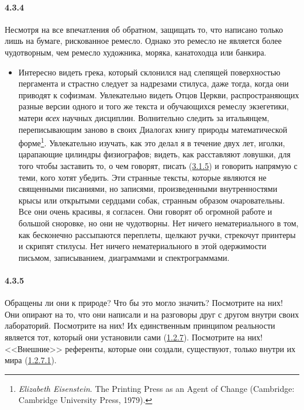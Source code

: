 \paragraph{4.3.4}\hypertarget{par:4.3.4}{} Несмотря на все впечатления об обратном, защищать то, что написано только лишь на бумаге, рискованное ремесло. Однако это ремесло не является более чудотворным, чем ремесло художника, моряка, канатоходца или банкира.
	\begin{itemize}
	\item 
	Интересно видеть грека, который склонился над слепящей поверхностью пергамента и страстно следует за надрезами стилуса, даже тогда, когда они приводят к софизмам. Увлекательно видеть Отцов Церкви, распространяющих разные версии одного и того же текста и обучающихся ремеслу экзегетики, матери {\itshape всех} научных дисциплин. Волнительно следить за итальянцем, переписывающим заново в своих Диалогах книгу природы математической форме\footnote{{\itshape Elizabeth Eisenstein}. The Printing Press as an Agent of Change (Cam­bridge: Cambridge University Press, 1979).}. Увлекательно изучать, как это делал я в течение двух лет, иголки, царапающие цилиндры физиографов; видеть, как расставляют ловушки, для того чтобы заставить то, о чем говорят, писать (\hyperlink{par:3.1.5}{3.1.5}) и говорить напрямую с теми, кого хотят убедить. Эти странные тексты, которые являются не священными писаниями, но записями, произведенными внутренностями крысы или открытыми сердцами собак, странным образом очаровательны. Все они очень красивы, я согласен. Они говорят об огромной работе и большой сноровке, но они не чудотворны. Нет ничего нематериального в том, как бесконечно рассыпаются переплеты, щелкают ручки, стрекочут принтеры и скрипят стилусы. Нет ничего нематериального в этой одержимости письмом, записыванием, диаграммами и спектрограммами.
	\end{itemize}	

\paragraph{4.3.5}\hypertarget{par:4.3.5}{} Обращены ли они к природе? Что бы это могло значить? Посмотрите на них! Они опирают на то, что они написали и на разговоры друг с другом внутри своих лабораторий. Посмотрите на них! Их единственным принципом реальности является тот, который они установили сами (\hyperlink{par:1.2.7}{1.2.7}). Посмотрите на них! <<Внешние>> референты, которые они создали, существуют, только внутри их мира (\hyperlink{par:1.2.7.1}{1.2.7.1}).


